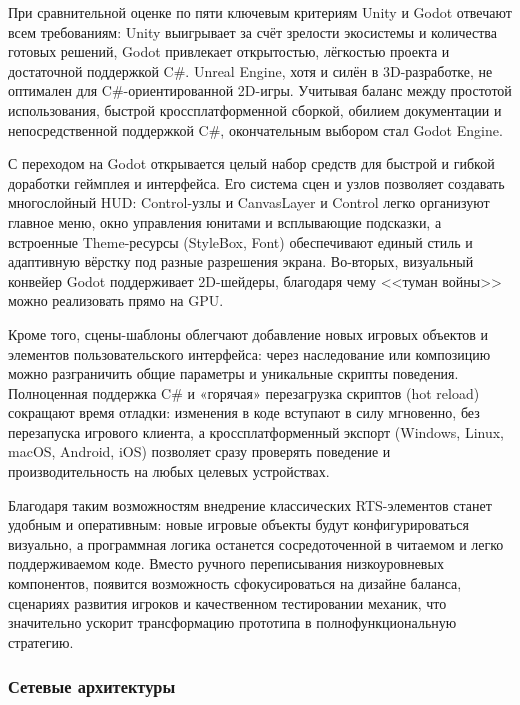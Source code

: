        При сравнительной оценке по пяти ключевым критериям Unity и Godot отвечают всем требованиям: Unity выигрывает за счёт зрелости экосистемы и количества готовых решений, 
        Godot привлекает открытостью, лёгкостью проекта и достаточной поддержкой C\#. Unreal Engine, хотя и силён в 3D-разработке, не оптимален для C\#-ориентированной 2D-игры. 
        Учитывая баланс между простотой использования, быстрой кроссплатформенной сборкой, обилием документации и непосредственной поддержкой C\#, окончательным выбором стал Godot Engine.

        С переходом на Godot открывается целый набор средств для быстрой и гибкой доработки геймплея и интерфейса. Его система сцен и узлов позволяет 
        создавать многослойный HUD: Control-узлы и CanvasLayer и Control легко организуют главное меню, окно управления юнитами и всплывающие подсказки, 
        а встроенные Theme-ресурсы (StyleBox, Font) обеспечивают единый стиль и адаптивную вёрстку под разные разрешения экрана. Во-вторых, визуальный конвейер Godot 
        поддерживает 2D-шейдеры, благодаря чему <<туман войны>> можно реализовать прямо на GPU.

        Кроме того, сцены-шаблоны облегчают добавление новых игровых объектов и элементов пользовательского интерфейса: через наследование или композицию можно разграничить общие параметры 
        и уникальные скрипты поведения. Полноценная поддержка C\# и «горячая» перезагрузка скриптов (hot reload) сокращают время отладки: изменения в коде вступают в силу мгновенно, 
        без перезапуска игрового клиента, а кроссплатформенный экспорт (Windows, Linux, macOS, Android, iOS) позволяет сразу проверять поведение и производительность на любых целевых устройствах.

        Благодаря таким возможностям внедрение классических RTS-элементов станет удобным и оперативным: новые игровые объекты будут конфигурироваться визуально, а программная логика 
        останется сосредоточенной в читаемом и легко поддерживаемом коде. Вместо ручного переписывания низкоуровневых компонентов, появится возможность сфокусироваться на дизайне 
        баланса, сценариях развития игроков и качественном тестировании механик, что значительно ускорит трансформацию прототипа в полнофункциональную стратегию.

        \subsubsection{Сетевые архитектуры}

